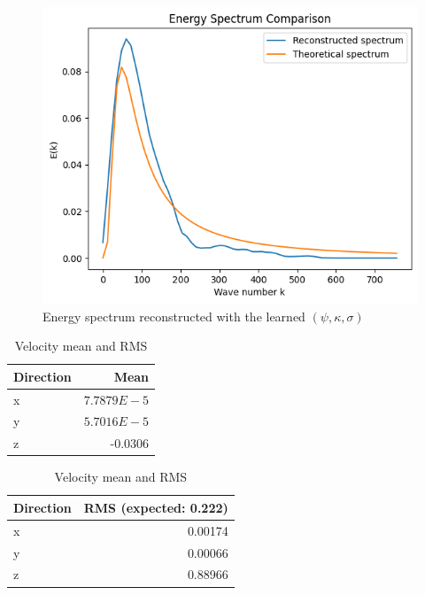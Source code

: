 \documentclass[11pt]{beamer}
\begin{document}
\begin{frame}
  \begin{figure}
    \centering
    \includegraphics[width=0.55\linewidth]{VelIncrPSIKAPPASIGMA/EnergySpectrum.png}
    \caption{Energy spectrum reconstructed with the learned $(\psi,\kappa,\sigma)$}
  \end{figure}

    \begin{table}
    \centering
    \begin{tabular}{lr}
      \toprule
      \textbf{Direction} & \textbf{Mean} \\
      \midrule
      x & $7.7879E-5$ \\
      y & $5.7016E-5$ \\
      z & -0.0306 \\
      \bottomrule
    \end{tabular}
    \qquad
    \begin{tabular}{lr}
      \toprule
      \textbf{Direction} & \textbf{RMS (expected: 0.222)} \\
      \midrule
      x & 0.00174 \\
      y & 0.00066 \\
      z & 0.88966 \\
      \bottomrule
    \end{tabular}
    \caption{Velocity mean and RMS}
  \end{table}
\end{frame}
\end{document}
